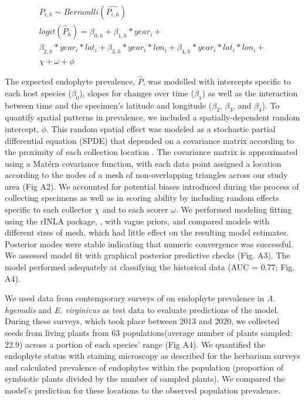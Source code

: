 \documentclass[11pt]{article}
\begin{document}
\begin{subequations}
		\label{eq:trends}
		\begin{align}
		P_{i,h} \sim Bernoulli(\hat{P_{i,h}}) \\
			logit(\hat{P}_{h}) = \beta_{0,h} + 
		\beta_{1,h}*year_{i} + \\
		\beta_{2,h}*year_{i} *lat_{i} + 
		\beta_{3,h}*year_{i} *lon_{i} + 
		\beta_{4,h}*year_{i} *lat_{i}*lon_{i} +\\
		\chi + \omega + \phi
		\end{align}
\end{subequations}

The expected endophyte prevalence, $\hat{P}$, was modelled with intercepts specific to each host species ($\beta_{0}$), slopes for changes over time ($\beta_{1}$) as well as the interaction between time and the specimen's latitude and longitude ($\beta_{2}$, $\beta_{3}$, and $\beta_{4}$). 
To quantify spatial patterns in prevalence, we included a spatially-dependent random intercept, $\phi$.
This random spatial effect was modeled as a stochastic partial differential equation (SPDE) that depended on a covariance matrix according to the proximity of each collection location \citep{lindgren2011explicit,bakka2018spatial}. 
The covariance matrix is approximated using a Matérn covariance function, with each data point assigned a location according to the nodes of a mesh of non-overlapping triangles across our study area (Fig A2).
We accounted for potential biases introduced during the process of collecting specimens as well as in scoring ability by including random effects specific to each collector $\chi$ and to each scorer $\omega$.
We performed modeling fitting using the rINLA package, \citep{lindgren2015bayesian}, with vague priors, and compared models with different sizes of mesh, which had little effect on the resulting model estimates.
Posterior modes were stable indicating that numeric convergence was successful.
We assessed model fit with graphical posterior predictive checks (Fig. A3).
The model performed adequately at classifying the historical data (AUC = 0.77; Fig. A4). 

We used data from contemporary surveys of on endophyte prevalence  in \emph{A. hyemalis} and \emph{E. virginicus} as test data to evaluate predictions of the model. 
During these surveys, which took place between 2013 and 2020, we collected seeds from living plants from 63 populations(average number of plants sampled: 22.9) across a portion of each species' range (Fig A4). 
We quantified the endophyte status with staining microscopy as described for the herbarium surveys and calculated prevalence of endophytes within the population (proportion of symbiotic plants divided by the number of sampled plants).
We compared the model's prediction for these locations to the observed population prevalence.
\end{document}
